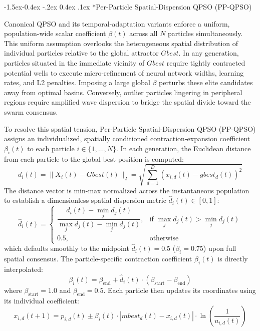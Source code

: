 \documentclass[10pt]{article}
\makeatletter
\renewcommand\subsubsection{\@startsection{subsubsection}{3}{\z@}%
                                     {-1.5ex\@plus -0.4ex \@minus -.2ex}%
                                     {0.4ex \@plus .1ex}%
                                     {\normalfont\itshape\fontsize{7.8pt}{10.0pt}\selectfont}}
\makeatother
\begin{document}
\subsubsection*{Per-Particle Spatial-Dispersion QPSO (PP-QPSO)}

Canonical QPSO and its temporal-adaptation variants enforce a uniform, population-wide scalar coefficient $\beta(t)$ across all $N$ particles simultaneously. This uniform assumption overlooks the heterogeneous spatial distribution of individual particles relative to the global attractor $Gbest$. In any generation, particles situated in the immediate vicinity of $Gbest$ require tightly contracted potential wells to execute micro-refinement of neural network widths, learning rates, and L2 penalties. Imposing a large global $\beta$ perturbs these elite candidates away from optimal basins. Conversely, outlier particles lingering in peripheral regions require amplified wave dispersion to bridge the spatial divide toward the swarm consensus.

To resolve this spatial tension, Per-Particle Spatial-Dispersion QPSO (PP-QPSO) assigns an individualized, spatially conditioned contraction-expansion coefficient $\beta_i(t)$ to each particle $i \in \{1, \dots, N\}$. In each generation, the Euclidean distance from each particle to the global best position is computed:
\begin{equation}
d_i(t) = \|X_i(t) - Gbest(t)\|_2 = \sqrt{\sum_{d=1}^D (x_{i,d}(t) - gbest_d(t))^2} \label{eq:ppqpso_dist}
\end{equation}
The distance vector is min-max normalized across the instantaneous population to establish a dimensionless spatial dispersion metric $\hat{d}_i(t) \in [0, 1]$:
\begin{equation}
\hat{d}_i(t) = \begin{cases}
\dfrac{d_i(t) - \min_{j} d_j(t)}{\max_{j} d_j(t) - \min_{j} d_j(t)}, & \text{if } \max_{j} d_j(t) > \min_{j} d_j(t) \\[6pt]
0.5, & \text{otherwise}
\end{cases} \label{eq:ppqpso_norm_dist}
\end{equation}
which defaults smoothly to the midpoint $\hat{d}_i(t) = 0.5$ ($\beta_i = 0.75$) upon full spatial consensus. The particle-specific contraction coefficient $\beta_i(t)$ is directly interpolated:
\begin{equation}
\beta_i(t) = \beta_{\mathrm{end}} + \hat{d}_i(t) \cdot (\beta_{\mathrm{start}} - \beta_{\mathrm{end}}) \label{eq:ppqpso_beta_i}
\end{equation}
where $\beta_{\mathrm{start}} = 1.0$ and $\beta_{\mathrm{end}} = 0.5$. Each particle then updates its coordinates using its individual coefficient:
\begin{equation}
x_{i,d}(t+1) = p_{i,d}(t) \pm \beta_i(t) \cdot |mbest_d(t) - x_{i,d}(t)| \cdot \ln\left( \frac{1}{u_{i,d}(t)} \right) \label{eq:ppqpso_pos}
\end{equation}
\end{document}

